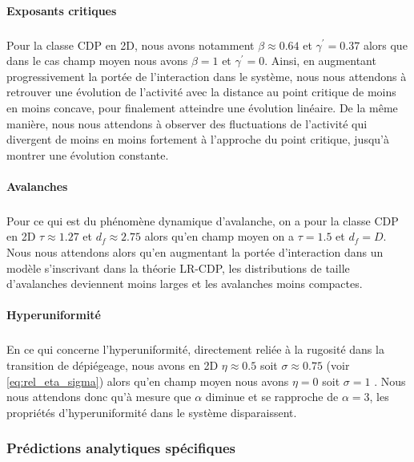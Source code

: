 \paragraph{Exposants critiques}

\subparagraph{}Pour la classe CDP en 2D, nous avons notamment $\beta\approx 0.64$ et $\gamma^\prime = 0.37$ alors que dans le cas champ moyen nous avons $\beta=1$ et $\gamma^\prime = 0$. Ainsi, en augmentant progressivement la portée de l'interaction dans le système, nous nous attendons à retrouver une évolution de l'activité avec la distance au point critique de moins en moins concave, pour finalement atteindre une évolution linéaire. De la même manière, nous nous attendons à observer des fluctuations de l'activité qui divergent de moins en moins fortement à l'approche du point critique, jusqu'à montrer une évolution constante.

\paragraph{Avalanches}

\subparagraph{}Pour ce qui est du phénomène dynamique d'avalanche, on a pour la classe CDP en 2D $\tau\approx 1.27$ et $d_f\approx 2.75$ \cite{chessa_universality_1999, lubeck_universal_2004, chessa_critical_1999, wiese_theory_2022, rosso_depinning_2003} alors qu'en champ moyen on a $\tau = 1.5$ et $d_f=D$. Nous nous attendons alors qu'en augmentant la portée d'interaction dans un modèle s'inscrivant dans la théorie LR-CDP, les distributions de taille d'avalanches deviennent moins larges et les avalanches moins compactes.

\paragraph{Hyperuniformité}

\subparagraph{}En ce qui concerne l'hyperuniformité, directement reliée à la rugosité dans la transition de dépiégeage, nous avons en 2D $\eta \approx 0.5$ soit $\sigma \approx 0.75$ (voir \autoref{eq:rel_eta_sigma}) alors qu'en champ moyen nous avons $\eta = 0$ soit $\sigma = 1$ \cite{wiese_theory_2022}. Nous nous attendons donc qu'à mesure que $\alpha$ diminue et se rapproche de $\alpha=3$, les propriétés d'hyperuniformité dans le système disparaissent.

\subsubsection{Prédictions analytiques spécifiques}

